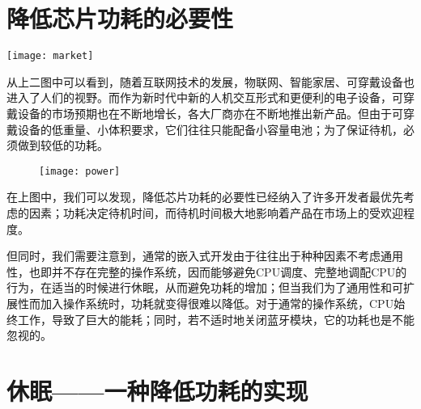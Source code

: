 \documentclass{ctexart}
\begin{document}
\section{降低芯片功耗的必要性}

\texttt{[image: market]}\par
从上二图中可以看到，随着互联网技术的发展，物联网、智能家居、可穿戴设备也进入了人们的视野。\cite{Ballve2013-bp}而作为新时代中新的人机交互形式和更便利的电子设备，可穿戴设备的市场预期也在不断地增长，各大厂商亦在不断地推出新产品。\cite{noauthor_2015-cg}但由于可穿戴设备的低重量、小体积要求，它们往往只能配备小容量电池；为了保证待机，必须做到较低的功耗。\par
\begin{figure}[h]
\centering
\texttt{[image: power]}\par
\end{figure}
在上图中\cite{survey}，我们可以发现，降低芯片功耗的必要性已经纳入了许多开发者最优先考虑的因素；功耗决定待机时间，而待机时间极大地影响着产品在市场上的受欢迎程度。\par
但同时，我们需要注意到，通常的嵌入式开发由于往往出于种种因素不考虑通用性，也即并不存在完整的操作系统，因而能够避免CPU调度、完整地调配CPU的行为，在适当的时候进行休眠，从而避免功耗的增加；但当我们为了通用性和可扩展性而加入操作系统时，功耗就变得很难以降低。对于通常的操作系统，CPU始终工作，导致了巨大的能耗；同时，若不适时地关闭蓝牙模块，它的功耗也是不能忽视的。

\section{休眠——一种降低功耗的实现}
\end{document}
